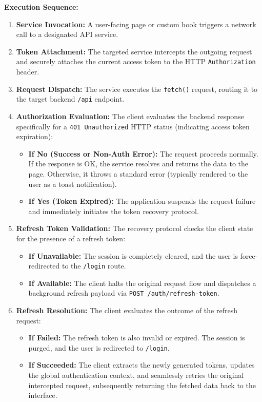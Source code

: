 \vspace{0.2cm}
\noindent\textbf{Execution Sequence:}
\begin{enumerate}
    \item \textbf{Service Invocation:} A user-facing page or custom hook triggers a network call to a designated API service.
    \item \textbf{Token Attachment:} The targeted service intercepts the outgoing request and securely attaches the current access token to the HTTP \texttt{Authorization} header.
    \item \textbf{Request Dispatch:} The service executes the \texttt{fetch()} request, routing it to the target backend \texttt{/api} endpoint.
    \item \textbf{Authorization Evaluation:} The client evaluates the backend response specifically for a \texttt{401 Unauthorized} HTTP status (indicating access token expiration):
    \begin{itemize}
        \item \textbf{If No (Success or Non-Auth Error):} The request proceeds normally. If the response is OK, the service resolves and returns the data to the page. Otherwise, it throws a standard error (typically rendered to the user as a toast notification).
        \item \textbf{If Yes (Token Expired):} The application suspends the request failure and immediately initiates the token recovery protocol.
    \end{itemize}
    \item \textbf{Refresh Token Validation:} The recovery protocol checks the client state for the presence of a refresh token:
    \begin{itemize}
        \item \textbf{If Unavailable:} The session is completely cleared, and the user is force-redirected to the \texttt{/login} route.
        \item \textbf{If Available:} The client halts the original request flow and dispatches a background refresh payload via \texttt{POST /auth/refresh-token}.
    \end{itemize}
    \item \textbf{Refresh Resolution:} The client evaluates the outcome of the refresh request:
    \begin{itemize}
        \item \textbf{If Failed:} The refresh token is also invalid or expired. The session is purged, and the user is redirected to \texttt{/login}.
        \item \textbf{If Succeeded:} The client extracts the newly generated tokens, updates the global authentication context, and seamlessly retries the original intercepted request, subsequently returning the fetched data back to the interface.
    \end{itemize}
\end{enumerate}

